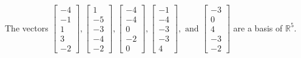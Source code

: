 \begin{exercise}
\begin{exerciseStatement}
  \end{exerciseStatement}
  \begin{exerciseAnswer}
   The vectors \(\left[\begin{array}{r}
-4 \\
-1 \\
1 \\
3 \\
-2
\end{array}\right] , \left[\begin{array}{r}
1 \\
-5 \\
-3 \\
-4 \\
-2
\end{array}\right] , \left[\begin{array}{r}
-4 \\
-4 \\
0 \\
-2 \\
0
\end{array}\right] , \left[\begin{array}{r}
-1 \\
-4 \\
-3 \\
-3 \\
4
\end{array}\right] , \text{ and } \left[\begin{array}{r}
-3 \\
0 \\
4 \\
-3 \\
-2
\end{array}\right]\) 
  	 are  a basis of \(\mathbb{R}^5\).
  


  \end{exerciseAnswer}
\end{exercise}